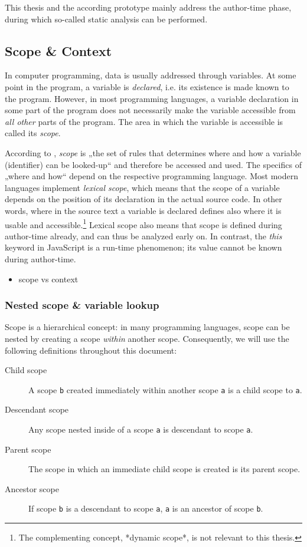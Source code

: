 This thesis and the according prototype mainly address the author-time
phase, during which so-called static analysis can be performed.

\subsection{Scope \& Context}\label{scope-context}

In computer programming, data is usually addressed through variables. At
some point in the program, a variable is \emph{declared}, i.e. its
existence is made known to the program. However, in most programming
languages, a variable declaration in some part of the program does not
necessarily make the variable accessible from \emph{all other} parts of
the program. The area in which the variable is accessible is called its
\emph{scope}.

According to , \emph{scope} is „the set of rules that
determines where and how a variable (identifier) can be looked-up“ and
therefore be accessed and used. The specifics of „where and how“ depend
on the respective programming language. Most modern languages implement
\emph{lexical scope}, which means that the scope of a variable depends
on the position of its declaration in the actual source code. In other
words, where in the source text a variable is declared defines also
where it is usable and
accessible.\footnote{The complementing concept, *dynamic scope*, is not relevant to this thesis.}
Lexical scope also means that scope is defined during author-time
already, and can thus be analyzed early on. In contrast, the \emph{this}
keyword in JavaScript is a run-time phenomenon; its value cannot be
known during author-time.

\begin{itemize}
\itemsep1pt\parskip0pt
\item
  scope vs context
\end{itemize}

\subsubsection{Nested scope \& variable
lookup}\label{nested-scope-variable-lookup}

Scope is a hierarchical concept: in many programming languages, scope
can be nested by creating a scope \emph{within} another scope.
Consequently, we will use the following definitions throughout this
document:

\begin{description}
\item[Child scope]
A scope \texttt{b} created immediately within another scope \texttt{a}
is a child scope to \texttt{a}.
\item[Descendant scope]
Any scope nested inside of a scope \texttt{a} is descendant to scope
\texttt{a}.
\item[Parent scope]
The scope in which an immediate child scope is created is its parent
scope.
\item[Ancestor scope]
If scope \texttt{b} is a descendant to scope \texttt{a}, \texttt{a} is
an ancestor of scope \texttt{b}.
\end{description}

